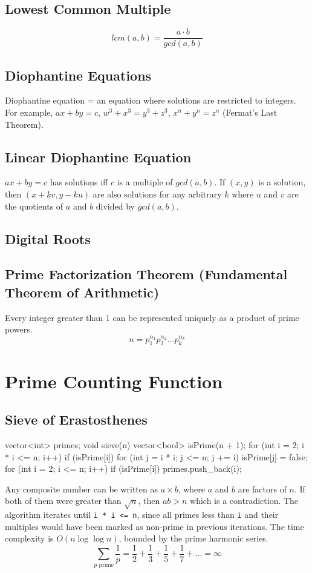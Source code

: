 \documentclass[12pt]{extarticle}
\begin{document}
\subsection*{Lowest Common Multiple}
$$lcm(a,b)=\frac{a\cdot b}{gcd(a,b)}$$
\subsection*{Diophantine Equations}
Diophantine equation = an equation where solutions are restricted to integers. For example, $ax+by=c$, $w^{3}+x^{3}=y^{3}+z^{3}$, $x^{n}+y^{n}=z^{n}$ (Fermat's Last Theorem).
\subsection*{Linear Diophantine Equation}
$ax+by=c$ has solutions iff $c$ is a multiple of $gcd(a,b)$. If $(x,y)$ is a solution, then $(x+kv, y-ku)$ are also solutions for any arbitrary $k$ where $u$ and $v$ are the quotients of $a$ and $b$ divided by $gcd(a,b)$.
\subsection*{Digital Roots}
\subsection*{Prime Factorization Theorem (Fundamental Theorem of Arithmetic)}
Every integer greater than 1 can be represented uniquely as a product of prime powers. 
$$n=p_{1}^{\alpha_{1}}p_{2}^{\alpha_{2}}\dots p_{k}^{\alpha_{k}}$$ 


\section*{Prime Counting Function}
\subsection*{Sieve of Erastosthenes}
\begin{cpp}
vector<int> primes;
void sieve(n) {
	vector<bool> isPrime(n + 1);
	for (int i = 2; i * i <= n; i++) {
		if (isPrime[i]) {
			for (int j = i * i; j <= n; j += i) isPrime[j] = false;
		}
	}
	for (int i = 2; i <= n; i++) {
		if (isPrime[i]) primes.push_back(i);
	}
}
\end{cpp}
Any composite number can be written as $a\times b$, where $a$ and $b$ are factors of $n$. If both of them were greater than $\sqrt{n}$, then $ab>n$ which is a contradiction. The algorithm iterates until \texttt{i * i <= n}, since all primes less than \texttt{i} and their multiples would have been marked as non-prime in previous iterations. The time complexity is $O(n \log \log n)$, bounded by the prime harmonic series.
$$\sum_{p\text{ prime}}\frac{1}{p}=\frac{1}{2}+\frac{1}{3}+\frac{1}{5}+\frac{1}{7}+\dots=\infty$$
\end{document}
